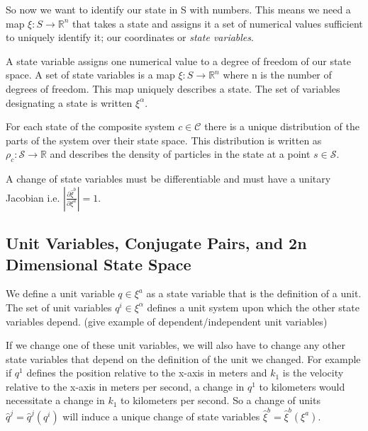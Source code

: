 \documentclass{article}
\begin{document}
	So now we want to identify our state in S with numbers. This means we need a map $\xi : S \rightarrow \mathbb{R}^n $ that takes a state and assigns it a set of numerical values sufficient to uniquely identify it; our coordinates or \textit{state variables}.%

\begin{defn}
	A state variable assigns one numerical value to a degree of freedom of our state space. A set of state variables is a map $\xi : S \rightarrow \mathbb{R}^n $ where n is the number of degrees of freedom. This map uniquely describes a state. The set of variables designating a state is written $\xi^\alpha$.
\end{defn}

\begin{defn}
	For each state of the composite system $c \in \mathcal{C}$ there is a unique distribution of the parts of the system over their state space. This distribution is written as $\rho_c: \mathcal{S} \rightarrow \mathbb{R}$ and describes the density of particles in the state at a point $s \in \mathcal{S}$.
\end{defn}

\begin{prop}
	A change of state variables must be differentiable and must have a unitary Jacobian i.e. $\left|\frac{\partial\hat{\xi}^b}{\partial\xi^a}\right| = 1$.
\end{prop}


\subsection{Unit Variables, Conjugate Pairs, and 2n Dimensional State Space}

\begin{defn}
	We define a unit variable $q \in \xi^a$ as a state variable that is the definition of a unit. The set of unit variables $q^i \in \xi^\alpha$ defines a unit system upon which the other state variables depend. (give example of dependent/independent unit variables)
\end{defn}

	If we change one of these unit variables, we will also have to change any other state variables that depend on the definition of the unit we changed. For example if $q^1$ defines the position relative to the x-axis in meters and $k_1$ is the velocity relative to the x-axis in meters per second, a change in $q^1$ to kilometers would necessitate a change in $k_1$ to kilometers per second. So a change of units $\hat{q}^j = \hat{q}^j(q^i)$ will induce a unique change of state variables $\hat{\xi}^b = \hat{\xi}^b(\xi^a)$.
\end{document}
